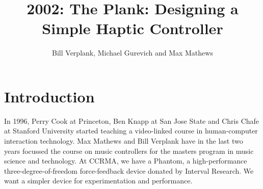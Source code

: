
\graphicspath{ {mainmatter/Verplank_2002/} }
\title*{2002: The Plank: Designing a Simple Haptic Controller}

\author{Bill Verplank, Michael Gurevich and Max Mathews}

%
%
\maketitle


\section{Introduction}

In 1996, Perry Cook at Princeton, Ben Knapp at San Jose State and Chris Chafe at Stanford University started teaching a video-linked course in human-computer interaction technology. Max Mathews and Bill Verplank have in the last two years focussed the course on music controllers \cite{Verplank:2001} for the masters program in music science and technology. At CCRMA, we have a Phantom, a high-performance three-degree-of-freedom force-feedback device donated by Interval Research. We want a simpler device for experimentation and performance.

